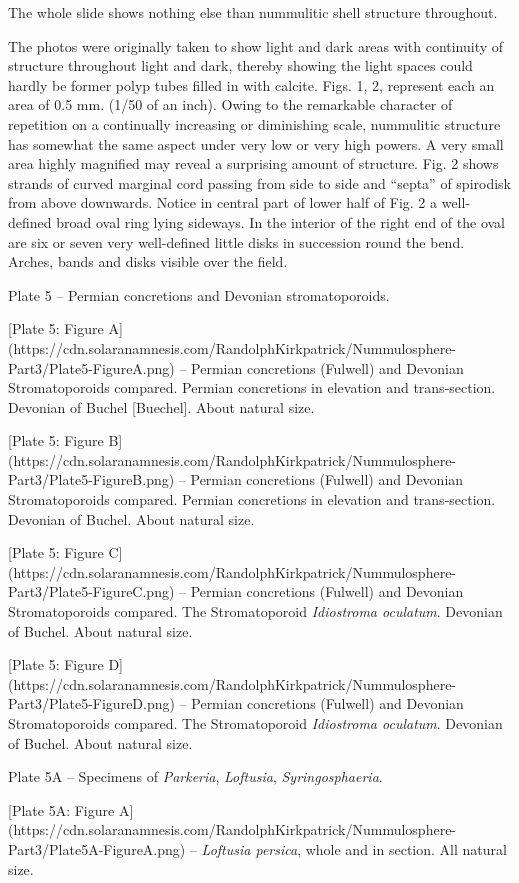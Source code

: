 \documentclass[a4paper, 12pt, oneside]{article}
\begin{document}
The whole slide shows nothing else than nummulitic shell structure throughout.

The photos were originally taken to show light and dark areas with continuity of structure throughout light and dark, thereby showing the light spaces could hardly be former polyp tubes filled in with calcite. Figs. 1, 2, represent each an area of 0.5 mm. (1/50 of an inch). Owing to the remarkable character of repetition on a continually increasing or diminishing scale, nummulitic structure has somewhat the same aspect under very low or very high powers. A very small area highly magnified may reveal a surprising amount of structure. Fig. 2 shows strands of curved marginal cord passing from side to side and ``septa'' of spirodisk from above downwards. Notice in central part of lower half of Fig. 2 a well-defined broad oval ring lying sideways. In the interior of the right end of the oval are six or seven very well-defined little disks in succession round the bend. Arches, bands and disks visible over the field.

Plate 5 -- Permian concretions and Devonian stromatoporoids.

[Plate 5: Figure A](https://cdn.solaranamnesis.com/RandolphKirkpatrick/Nummulosphere-Part3/Plate5-FigureA.png) -- Permian concretions (Fulwell) and Devonian Stromatoporoids compared. Permian concretions in elevation and trans-section. Devonian of Buchel [Buechel]. About natural size.

[Plate 5: Figure B](https://cdn.solaranamnesis.com/RandolphKirkpatrick/Nummulosphere-Part3/Plate5-FigureB.png) -- Permian concretions (Fulwell) and Devonian Stromatoporoids compared. Permian concretions in elevation and trans-section. Devonian of Buchel. About natural size.

[Plate 5: Figure C](https://cdn.solaranamnesis.com/RandolphKirkpatrick/Nummulosphere-Part3/Plate5-FigureC.png) -- Permian concretions (Fulwell) and Devonian Stromatoporoids compared. The Stromatoporoid \emph{Idiostroma oculatum}. Devonian of Buchel. About natural size.

[Plate 5: Figure D](https://cdn.solaranamnesis.com/RandolphKirkpatrick/Nummulosphere-Part3/Plate5-FigureD.png) -- Permian concretions (Fulwell) and Devonian Stromatoporoids compared. The Stromatoporoid \emph{Idiostroma oculatum}. Devonian of Buchel. About natural size.

Plate 5A -- Specimens of \emph{Parkeria}, \emph{Loftusia}, \emph{Syringosphaeria}.

[Plate 5A: Figure A](https://cdn.solaranamnesis.com/RandolphKirkpatrick/Nummulosphere-Part3/Plate5A-FigureA.png) -- \emph{Loftusia persica}, whole and in section. All natural size.
\end{document}
